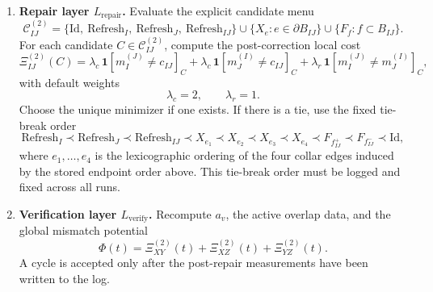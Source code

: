 \documentclass[11pt]{article}
\begin{document}
\begin{enumerate}[leftmargin=2em]
\begin{equation}
c_{IJ}=C_{IJ},\qquad
b_{IJ}^{+}=B_{f_{IJ}^{+}},\qquad
b_{IJ}^{-}=B_{f_{IJ}^{-}},
\end{equation}
together with the two cached record values
\begin{equation}
m_I^{(J)}=Z_{r_I^{(J)}},\qquad
m_J^{(I)}=Z_{r_J^{(I)}}.
\end{equation}
For the named overlaps the face labels are
\begin{align}
(f_{XY}^{+},f_{XY}^{-})&=(f_{+++},f_{++-}),\\
(f_{XZ}^{+},f_{XZ}^{-})&=(f_{+++},f_{+-+}),\\
(f_{YZ}^{+},f_{YZ}^{-})&=(f_{+++},f_{-++}).
\end{align}
\item \textbf{Repair layer $L_{\mathrm{repair}}$.}
Evaluate the explicit candidate menu
\begin{equation}
\mathcal C_{IJ}^{(2)}
=
\{\mathrm{Id},\ \mathrm{Refresh}_I,\ \mathrm{Refresh}_J,\ \mathrm{Refresh}_{IJ}\}
\cup
\{X_e:e\in \partial B_{IJ}\}
\cup
\{F_f:f\subset B_{IJ}\}.
\end{equation}
For each candidate $C\in\mathcal C_{IJ}^{(2)}$, compute the post-correction local cost
\begin{equation}
\Xi_{IJ}^{(2)}(C)
=
\lambda_c\,\mathbf 1[m_I^{(J)}\neq c_{IJ}]_C
+
\lambda_c\,\mathbf 1[m_J^{(I)}\neq c_{IJ}]_C
+
\lambda_r\,\mathbf 1[m_I^{(J)}\neq m_J^{(I)}]_C,
\end{equation}
with default weights
\begin{equation}
\lambda_c=2,
\qquad \lambda_r=1.
\end{equation}
Choose the unique minimizer if one exists. If there is a tie, use the fixed tie-break order
\begin{equation}
\mathrm{Refresh}_I \prec \mathrm{Refresh}_J \prec \mathrm{Refresh}_{IJ}
\prec X_{e_1}\prec X_{e_2}\prec X_{e_3}\prec X_{e_4}
\prec F_{f_{IJ}^{+}}\prec F_{f_{IJ}^{-}}\prec \mathrm{Id},
\end{equation}
where $e_1,\dots,e_4$ is the lexicographic ordering of the four collar edges induced by the
stored endpoint order above. This tie-break order must be logged and fixed across all runs.
\item \textbf{Verification layer $L_{\mathrm{verify}}$.}
Recompute $a_v$, the active overlap data, and the global mismatch potential
\begin{equation}
\Phi(t)=\Xi_{XY}^{(2)}(t)+\Xi_{XZ}^{(2)}(t)+\Xi_{YZ}^{(2)}(t).
\end{equation}
A cycle is accepted only after the post-repair measurements have been written to the log.
\end{enumerate}
\end{document}
